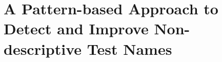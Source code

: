 \documentclass[proposal.tex]{subfiles}
\begin{document}
\section{A Pattern-based Approach to Detect and Improve Non-descriptive Test Names}
\label{sec:test-pattern}
\end{document}
